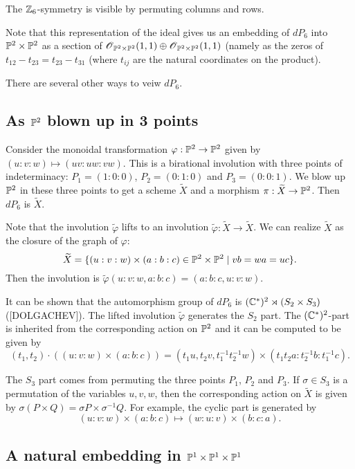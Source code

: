 \documentclass[11pt, english]{article}
\begin{document}
The $\mathbb{Z}_6$-symmetry is visible by permuting columns and rows. 

Note that this representation of the ideal gives us an embedding of $dP_6$ into $\mathbb{P}^2 \times \mathbb{P}^2$ as a section of $\operatorname{\mathscr{O}}_{\mathbb{P}^2 \times \mathbb{P}^2}(1,1)\oplus\operatorname{\mathscr{O}}_{\mathbb{P}^2 \times \mathbb{P}^2}(1,1)$ (namely as the zeros of $t_{12}-t_{23}=t_{23}-t_{31}$ (where $t_{ij}$ are the natural coordinates on the product).

There are several other ways to veiw $dP_6$.

\subsection{As $\mathbb{P}^2$ blown up in 3 points}

Consider the monoidal transformation $\varphi:\mathbb{P}^2 \to \mathbb{P}^2$ given by $(u:v:w) \mapsto (uv:uw:vw)$. This is a birational involution with three points of indeterminacy: $P_1=(1:0:0)$, $P_2=(0:1:0)$ and $P_3=(0:0:1)$. We blow up $\mathbb{P}^2$ in these three points to get a scheme $\widetilde X$ and a morphism $\pi:\widetilde X \to \mathbb{P}^2$. Then $dP_6$ is $\widetilde X$.

\begin{remark}
Note that the involution $\widetilde \varphi $ lifts to an involution  $\widetilde \varphi: \widetilde X \to \widetilde X$. We can realize $\widetilde X$ as the closure of the graph of $\varphi$:
$$
\widetilde X = \{ (u:v:w) \times  (a:b:c) \in \mathbb{P}^2 \times \mathbb{P}^2 \mid vb=wa=uc \}.
$$
Then the involution is $\widetilde \varphi(u:v:w,a:b:c) = (a:b:c, u:v:w)$.
\end{remark}

It can be shown that the automorphism group of $dP_6$ is $(\mathbb{C}^\ast)^2 \rtimes (S_2 \times S_3)$ ([DOLGACHEV]). The lifted involution $\widetilde \varphi$ generates the $S_2$ part. The $(\mathbb{C}^\ast)^2$-part is inherited from the corresponding action on $\mathbb{P}^2$ and it can be computed to be given by
$$
(t_1,t_2) \cdot ((u:v:w)\times (a:b:c)) = (t_1u,t_2v, t_1^{-1}t_2^{-1}w) \times (t_1t_2a: t_2^{-1}b: t_1^{-1} c).
$$

The $S_3$ part comes from permuting the three points $P_1$, $P_2$ and $P_3$. If $\sigma \in S_3$ is a permutation of the variables $u,v,w$, then the corresponding action on $\widetilde X$ is given by $\sigma (P \times Q)=\sigma P \times \sigma^{-1} Q$. For example, the cyclic part is generated by
$$
(u:v:w)\times (a:b:c) \mapsto (w:u:v) \times(b:c:a).
$$


\subsection{A natural embedding in $\mathbb{P}^1 \times \mathbb{P}^1 \times \mathbb{P}^1$}
\end{document}
